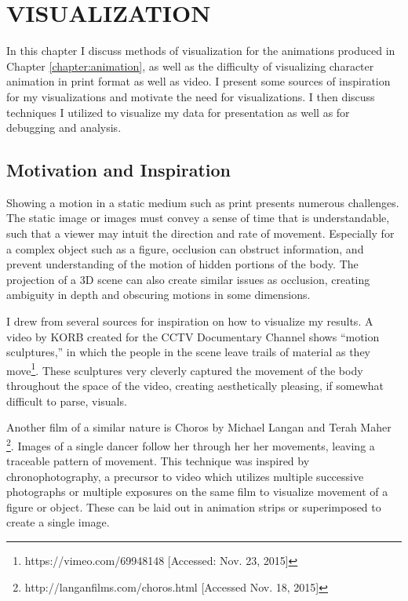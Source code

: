 
 
\chapter{VISUALIZATION}
\label{chapter:visualization}
In this chapter I discuss methods of visualization for the animations produced in Chapter \ref{chapter:animation}, as well as the difficulty of visualizing character animation in print format as well as video.  I present some sources of inspiration for my visualizations and motivate the need for visualizations.  I then discuss techniques I utilized to visualize my data for presentation as well as for debugging and analysis.

\section{Motivation and Inspiration}
\label{section:vis_insp}
Showing a motion in a static medium such as print presents numerous challenges.  The static image or images must convey a sense of time that is understandable, such that a viewer may intuit the direction and rate of movement.  Especially for a complex object such as a figure, occlusion can obstruct information, and prevent understanding of the motion of hidden portions of the body.  The projection of a 3D scene can also create similar issues as occlusion, creating ambiguity in depth and obscuring motions in some dimensions.

I drew from several sources for inspiration on how to visualize my results.  A video by KORB created for the CCTV Documentary Channel shows ``motion sculptures,'' in which the people in the scene leave trails of material as they move\footnote{https://vimeo.com/69948148 [Accessed: Nov. 23, 2015]}.  These sculptures very cleverly captured the movement of the body throughout the space of the video, creating aesthetically pleasing, if somewhat difficult to parse, visuals.

Another film of a similar nature is Choros by Michael Langan and Terah Maher \footnote{http://langanfilms.com/choros.html [Accessed Nov. 18, 2015]}.  Images of a single dancer follow her through her her movements, leaving a traceable pattern of movement.  This technique was inspired by chronophotography, a precursor to video which utilizes multiple successive photographs or multiple exposures on the same film to visualize movement of a figure or object.  These can be laid out in animation strips or superimposed to create a single image.

